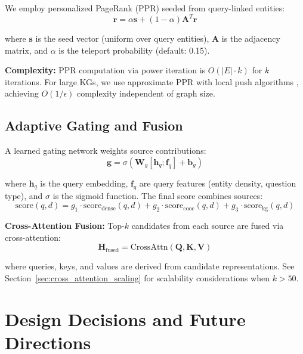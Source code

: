\documentclass[11pt,a4paper]{article}
\begin{document}
We employ personalized PageRank (PPR) seeded from query-linked entities:
\begin{equation}
\mathbf{r} = \alpha \mathbf{s} + (1 - \alpha) \mathbf{A}^T \mathbf{r}
\end{equation}

where $\mathbf{s}$ is the seed vector (uniform over query entities), $\mathbf{A}$ is the adjacency matrix, and $\alpha$ is the teleport probability (default: 0.15).

\textbf{Complexity:} PPR computation via power iteration is $O(|E| \cdot k)$ for $k$ iterations. For large KGs, we use approximate PPR with local push algorithms \citep{andersen2006local}, achieving $O(1/\epsilon)$ complexity independent of graph size.

\subsection{Adaptive Gating and Fusion}
\label{sec:gating}

A learned gating network weights source contributions:
\begin{equation}
\mathbf{g} = \sigma(\mathbf{W}_g [\mathbf{h}_q; \mathbf{f}_q] + \mathbf{b}_g)
\end{equation}

where $\mathbf{h}_q$ is the query embedding, $\mathbf{f}_q$ are query features (entity density, question type), and $\sigma$ is the sigmoid function. The final score combines sources:
\begin{equation}
\text{score}(q, d) = g_1 \cdot \text{score}_{\text{dense}}(q, d) + g_2 \cdot \text{score}_{\text{cooc}}(q, d) + g_3 \cdot \text{score}_{\text{kg}}(q, d)
\end{equation}

\textbf{Cross-Attention Fusion:} Top-$k$ candidates from each source are fused via cross-attention:
\begin{equation}
\mathbf{H}_{\text{fused}} = \text{CrossAttn}(\mathbf{Q}, \mathbf{K}, \mathbf{V})
\end{equation}

where queries, keys, and values are derived from candidate representations. See Section~\ref{sec:cross_attention_scaling} for scalability considerations when $k > 50$.

\section{Design Decisions and Future Directions}
\label{sec:design_decisions}
\end{document}
